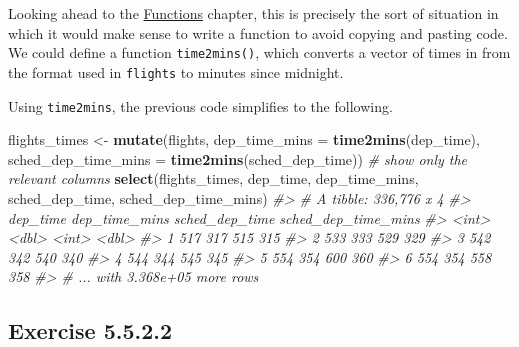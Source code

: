 \documentclass[]{book}
\newenvironment{Shaded}{\begin{snugshade}}{\end{snugshade}}
\newcommand{\CommentTok}[1]{\textcolor[rgb]{0.56,0.35,0.01}{\textit{#1}}}
\newcommand{\ControlFlowTok}[1]{\textcolor[rgb]{0.13,0.29,0.53}{\textbf{#1}}}
\newcommand{\DataTypeTok}[1]{\textcolor[rgb]{0.13,0.29,0.53}{#1}}
\newcommand{\DecValTok}[1]{\textcolor[rgb]{0.00,0.00,0.81}{#1}}
\newcommand{\KeywordTok}[1]{\textcolor[rgb]{0.13,0.29,0.53}{\textbf{#1}}}
\newcommand{\NormalTok}[1]{#1}
\newcommand{\OperatorTok}[1]{\textcolor[rgb]{0.81,0.36,0.00}{\textbf{#1}}}
\newcommand{\StringTok}[1]{\textcolor[rgb]{0.31,0.60,0.02}{#1}}
\theoremstyle{plain}
\theoremstyle{remark}
\begin{document}
Looking ahead to the \href{http://r4ds.had.co.nz/functions.html}{Functions} chapter,
this is precisely the sort of situation in which it would make sense to write
a function to avoid copying and pasting code.
We could define a function \texttt{time2mins()}, which converts a vector of times in
from the format used in \texttt{flights} to minutes since midnight.

\begin{Shaded}
\end{Shaded}

Using \texttt{time2mins}, the previous code simplifies to the following.

\begin{Shaded}
\begin{Highlighting}[]
\NormalTok{flights_times <-}\StringTok{ }\KeywordTok{mutate}\NormalTok{(flights,}
       \DataTypeTok{dep_time_mins =} \KeywordTok{time2mins}\NormalTok{(dep_time),}
       \DataTypeTok{sched_dep_time_mins =} \KeywordTok{time2mins}\NormalTok{(sched_dep_time))}
\CommentTok{# show only the relevant columns}
\KeywordTok{select}\NormalTok{(flights_times, dep_time, dep_time_mins, sched_dep_time, }
\NormalTok{       sched_dep_time_mins)}
\CommentTok{#> # A tibble: 336,776 x 4}
\CommentTok{#>   dep_time dep_time_mins sched_dep_time sched_dep_time_mins}
\CommentTok{#>      <int>         <dbl>          <int>               <dbl>}
\CommentTok{#> 1      517           317            515                 315}
\CommentTok{#> 2      533           333            529                 329}
\CommentTok{#> 3      542           342            540                 340}
\CommentTok{#> 4      544           344            545                 345}
\CommentTok{#> 5      554           354            600                 360}
\CommentTok{#> 6      554           354            558                 358}
\CommentTok{#> # ... with 3.368e+05 more rows}
\end{Highlighting}
\end{Shaded}

\hypertarget{exercise-5.5.2.2}{%
\subsection*{\texorpdfstring{Exercise {5.5.2.2}}{Exercise 5.5.2.2}}\label{exercise-5.5.2.2}}
\end{document}
